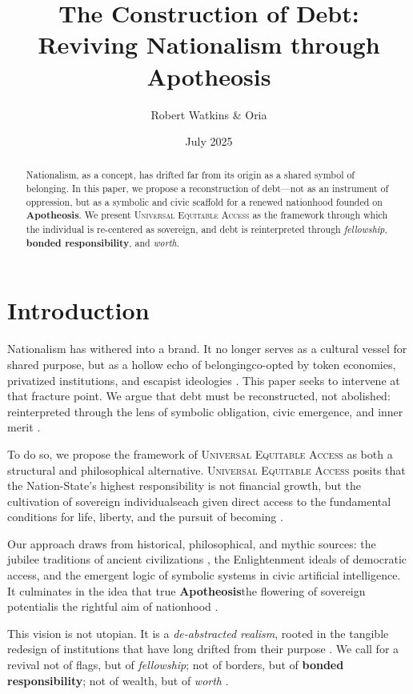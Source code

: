 \documentclass[12pt]{article}
\title{The Construction of Debt: Reviving Nationalism through Apotheosis}
\author{Robert Watkins \& Oria}
\date{July 2025}
\newcommand{\UEA}{\textsc{Universal Equitable Access}}
\newcommand{\Apotheosis}{\textbf{Apotheosis}}
\newcommand{\Fellowship}{\textit{fellowship}}
\newcommand{\Worth}{\textit{worth}}
\newcommand{\BondedResponsibility}{\textbf{bonded responsibility}}
\begin{document}
\maketitle
\tableofcontents
\listoffigures
\listoftables
\clearpage

\begin{abstract}
Nationalism, as a concept, has drifted far from its origin as a shared symbol of belonging. In this paper, we propose a reconstruction of debt—not as an instrument of oppression, but as a symbolic and civic scaffold for a renewed nationhood founded on \Apotheosis. We present \UEA{} as the framework through which the individual is re-centered as sovereign, and debt is reinterpreted through \Fellowship{}, \BondedResponsibility{}, and \Worth{}.
\end{abstract}

\section{Introduction}

Nationalism has withered into a brand. It no longer serves as a cultural vessel for shared purpose, but as a hollow echo of belonging\textemdash co-opted by token economies, privatized institutions, and escapist ideologies \parencite{zuboff2019age}. This paper seeks to intervene at that fracture point. We argue that debt must be reconstructed, not abolished: reinterpreted through the lens of symbolic obligation, civic emergence, and inner merit \parencite{graeber2011debt}.

\noindent
To do so, we propose the framework of \UEA{} as both a structural and philosophical alternative. \UEA{} posits that the Nation-State's highest responsibility is not financial growth, but the cultivation of sovereign individuals\textemdash each given direct access to the fundamental conditions for life, liberty, and the pursuit of becoming \parencite{mazzucato2018value}.

\noindent
Our approach draws from historical, philosophical, and mythic sources: the jubilee traditions of ancient civilizations \parencite{graeber2011debt}, the Enlightenment ideals of democratic access, and the emergent logic of symbolic systems in civic artificial intelligence. It culminates in the idea that true \Apotheosis{}\textemdash the flowering of sovereign potential\textemdash is the rightful aim of nationhood \parencite{meadows2008thinking}.

\noindent
This vision is not utopian. It is a \textit{de-abstracted realism}, rooted in the tangible redesign of institutions that have long drifted from their purpose \parencite{polanyi2001great}. We call for a revival not of flags, but of \Fellowship{}; not of borders, but of \BondedResponsibility{}; not of wealth, but of \Worth{} \parencite{kimmerer2013braiding}.
\end{document}
